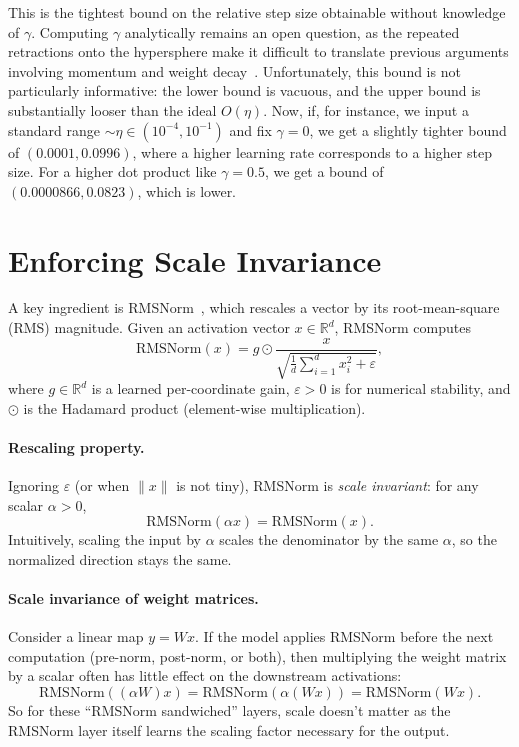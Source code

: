 \documentclass{article}
\begin{document}
This is the tightest bound on the relative step size obtainable without knowledge of $\gamma$. Computing $\gamma$ analytically remains an open question, as the repeated retractions onto the hypersphere make it difficult to translate previous arguments involving momentum and weight decay~\citep{hyperball}. Unfortunately, this bound is not particularly informative: the lower bound is vacuous, and the upper bound is substantially looser than the ideal $O(\eta)$. Now, if, for instance, we input a standard range $\sim\eta\in (10^{-4},10^{-1})$ and fix $\gamma=0$, we get a slightly tighter bound of $(0.0001, 0.0996)$, where a higher learning rate corresponds to a higher step size. For a higher dot product like $\gamma=0.5$, we get a bound of $(0.0000866, 0.0823)$, which is lower.


\section{Enforcing Scale Invariance}
\label{app:scale-inv}

A key ingredient is RMSNorm~\citep{rmsnorm}, which rescales a vector by its root-mean-square (RMS) magnitude. Given an activation vector $x\in\mathbb{R}^d$, RMSNorm computes
\[
\mathrm{RMSNorm}(x) = g\odot \frac{x}{\sqrt{\frac{1}{d}\sum_{i=1}^d x_i^2 + \varepsilon}},
\]
where $g\in\mathbb{R}^d$ is a learned per-coordinate gain, $\varepsilon>0$ is for numerical stability, and $\odot$ is the Hadamard product (element-wise multiplication).

\paragraph{Rescaling property.}
Ignoring $\varepsilon$ (or when $\|x\|$ is not tiny), RMSNorm is \emph{scale invariant}: for any scalar $\alpha>0$,
\[
\mathrm{RMSNorm}(\alpha x)= \mathrm{RMSNorm}(x).
\]
Intuitively, scaling the input by $\alpha$ scales the denominator by the same $\alpha$, so the normalized direction stays the same.

\paragraph{Scale invariance of weight matrices.}
Consider a linear map $y = Wx$. If the model applies RMSNorm before the next computation (pre-norm, post-norm, or both), then multiplying the weight matrix by a scalar often has little effect on the downstream activations:
\[
\mathrm{RMSNorm}((\alpha W)x) = \mathrm{RMSNorm}(\alpha (Wx)) = \mathrm{RMSNorm}(Wx).
\]
So for these ``RMSNorm sandwiched'' layers, scale doesn't matter as the RMSNorm layer itself learns the scaling factor necessary for the output.
\end{document}
